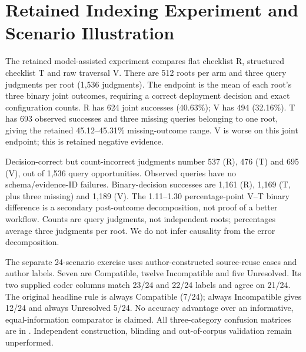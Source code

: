 \section{Retained Indexing Experiment and Scenario Illustration}\label{app:scope-workflow-boundary}
The retained model-assisted experiment compares flat checklist R, structured checklist T and raw \scope{} traversal V. There are 512 roots per arm and three query judgments per root (1,536 judgments). The endpoint is the mean of each root's three binary joint outcomes, requiring a correct deployment decision and exact configuration counts. R has 624 joint successes (40.63\%); V has 494 (32.16\%). T has 693 observed successes and three missing queries belonging to one root, giving the retained 45.12--45.31\% missing-outcome range. V is worse on this joint endpoint; this is retained negative evidence.

Decision-correct but count-incorrect judgments number 537 (R), 476 (T) and 695 (V), out of 1,536 query opportunities. Observed queries have no schema/evidence-ID failures. Binary-decision successes are 1,161 (R), 1,169 (T, plus three missing) and 1,189 (V). The 1.11--1.30 percentage-point V--T binary difference is a secondary post-outcome decomposition, not proof of a better workflow. Counts are query judgments, not independent roots; percentages average three judgments per root. We do not infer causality from the error decomposition.

The separate 24-scenario exercise uses author-constructed source-reuse cases and author labels. Seven are Compatible, twelve Incompatible and five Unresolved. Its two supplied coder columns match 23/24 and 22/24 labels and agree on 21/24. The original headline rule is always Compatible (7/24); always Incompatible gives 12/24 and always Unresolved 5/24. No accuracy advantage over an informative, equal-information comparator is claimed. All three-category confusion matrices are in . Independent construction, blinding and out-of-corpus validation remain unperformed.

